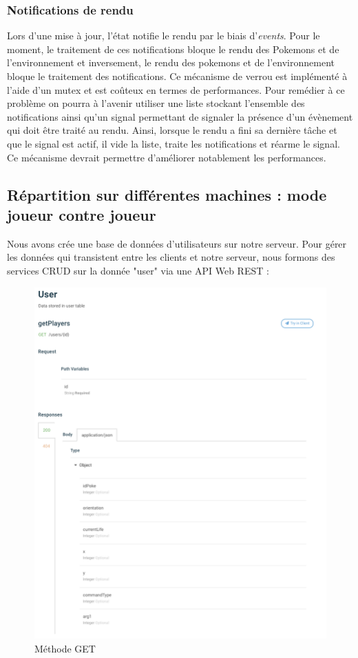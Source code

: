 \documentclass[a4paper,12pt]{article}
\begin{document}
\subsubsection{Notifications de rendu}   
    Lors d'une mise à jour, l'état notifie le rendu par le biais d'\emph{events}. Pour le moment, le traitement de ces notifications bloque le rendu des Pokemons et de l'environnement et inversement, le rendu des pokemons et de l'environnement bloque le traitement des notifications. Ce mécanisme de verrou est implémenté à l'aide d'un mutex et est coûteux en termes de performances. Pour remédier à ce problème on pourra à l'avenir utiliser une liste stockant l'ensemble des notifications ainsi qu'un signal permettant de signaler la présence d'un évènement qui doit être traité au rendu. Ainsi, lorsque le rendu a fini sa dernière tâche et que le signal est actif, il vide la liste, traite les notifications et réarme le signal. Ce mécanisme devrait permettre d'améliorer notablement les performances.
    
    \subsection{Répartition sur différentes machines : mode joueur contre joueur}
    
    Nous avons crée une base de données d'utilisateurs sur notre serveur. Pour gérer les données qui transistent entre les clients et notre serveur, nous formons des services CRUD sur la donnée "user" via une API Web REST :
    
    \begin{figure}[p]
    \includegraphics{GET.png}
    \caption{\label{uml:module}Méthode GET}
    \end{figure}
\end{document}
